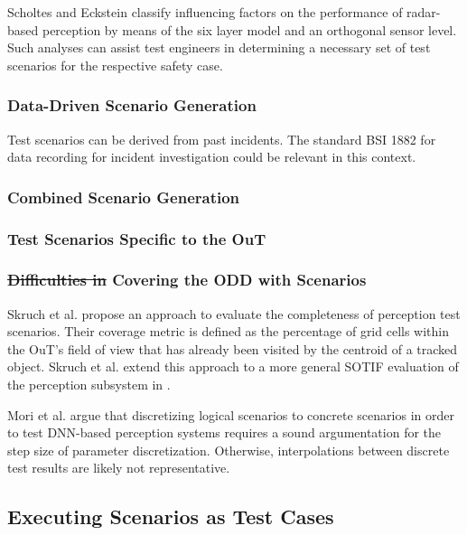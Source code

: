 \documentclass[conference]{IEEEtran}
\newcommand{\citeold}[1]{{\hypersetup{citecolor=black}\cite{#1}}}
\newcommand{\new}[1]{{\color{my-red}#1}}
\begin{document}
Scholtes and Eckstein \cite{Scholtes2021systematic} classify  influencing factors on the performance of radar-based perception by means of the six layer model \citeold{Scholtes20216lmAccess} and an orthogonal sensor level. 
Such analyses can assist test engineers in determining a necessary set of test scenarios for the respective safety case. 


\subsubsection{Data-Driven Scenario Generation}
\label{sec:scenario_gen_data_driven}

Test scenarios can be derived from past incidents. 
The standard BSI 1882 \cite{BSI2021_pas1882} for data recording for incident investigation could be relevant in this context.

\subsubsection{Combined Scenario Generation}
\subsubsection{Test Scenarios Specific to the \new{OuT}}
\subsubsection{\sout{Difficulties in }Covering the ODD with Scenarios}

Skruch et al. \cite{Skruch2021completeness} propose an approach to evaluate the completeness of perception test scenarios.
Their coverage metric is defined as the percentage of grid cells within the OuT's field of view that has already been visited by the centroid of a tracked object. 
Skruch et al. extend this approach to a more general SOTIF evaluation of the perception subsystem in \cite{Skruch2022safety}.

Mori et al. \cite{Mori2022discrete} argue that discretizing logical scenarios to concrete scenarios in order to test DNN-based perception systems requires a sound argumentation for the step size of parameter discretization. 
Otherwise, interpolations between discrete test results are likely not representative.

\subsection{Executing Scenarios as Test Cases}
\label{sec:executing_scenarios}
\end{document}
